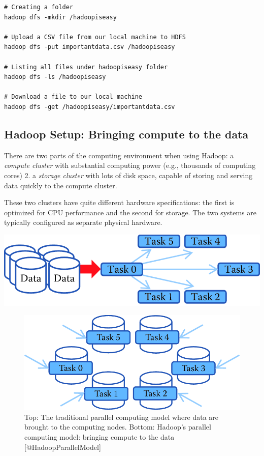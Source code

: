 \documentclass[]{krantz}
\begin{document}
\hypertarget{lst:hdfs}{\label{lst:hdfs}}
\begin{verbatim}
# Creating a folder
hadoop dfs -mkdir /hadoopiseasy

# Upload a CSV file from our local machine to HDFS
hadoop dfs -put importantdata.csv /hadoopiseasy

# Listing all files under hadoopiseasy folder
hadoop dfs -ls /hadoopiseasy

# Download a file to our local machine
hadoop dfs -get /hadoopiseasy/importantdata.csv
\end{verbatim}

\subsection{Hadoop Setup: Bringing compute to the
data}\label{hadoop-setup-bringing-compute-to-the-data}

There are two parts of the computing environment when using Hadoop: a
\emph{compute cluster} with substantial computing power (e.g., thousands
of computing cores) 2. a \emph{storage cluster} with lots of disk space,
capable of storing and serving data quickly to the compute cluster.

These two clusters have quite different hardware specifications: the
first is optimized for CPU performance and the second for storage. The
two systems are typically configured as separate physical hardware.

\begin{center}\includegraphics[width=0.7\linewidth]{ChapterParallel/figures/data2compute} \end{center}

\begin{figure}

{\centering \includegraphics[width=0.7\linewidth]{ChapterParallel/figures/compute2data} 

}

\caption{Top: The traditional parallel computing model where data are brought to the computing nodes. Bottom: Hadoop’s parallel computing model: bringing compute to the data [@HadoopParallelModel]}\label{fig:fig5-1a}
\end{figure}
\end{document}
